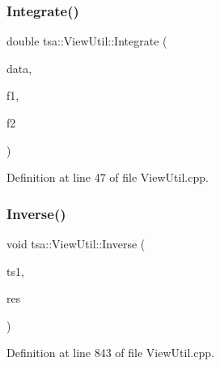 \subsubsection{\texorpdfstring{Integrate()}{Integrate()}\hspace{0.1cm}{\footnotesize\ttfamily [2/2]}}
{\footnotesize\ttfamily double tsa\+::\+View\+Util\+::\+Integrate (\begin{DoxyParamCaption}\item[{\hyperlink{namespacetsa_ac599574bcc094eda25613724b8f3ca9e}{Seq\+View\+Double} \&}]{data,  }\item[{double}]{f1,  }\item[{double}]{f2 }\end{DoxyParamCaption})\hspace{0.3cm}{\ttfamily [static]}}



Definition at line 47 of file View\+Util.\+cpp.

\mbox{\label{classtsa_1_1_view_util_a39c49e23ff6a7ea64aa1ced4fc453c53}} 
\subsubsection{\texorpdfstring{Inverse()}{Inverse()}}
{\footnotesize\ttfamily void tsa\+::\+View\+Util\+::\+Inverse (\begin{DoxyParamCaption}\item[{\hyperlink{namespacetsa_ac599574bcc094eda25613724b8f3ca9e}{Seq\+View\+Double} \&}]{ts1,  }\item[{\hyperlink{namespacetsa_ac599574bcc094eda25613724b8f3ca9e}{Seq\+View\+Double} \&}]{res }\end{DoxyParamCaption})\hspace{0.3cm}{\ttfamily [static]}}



Definition at line 843 of file View\+Util.\+cpp.

\mbox{\label{classtsa_1_1_view_util_a1d1f00f3a3ae89b3ddef911bf9835049}} 
